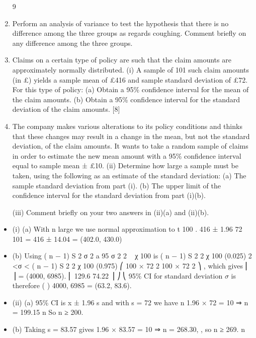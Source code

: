 \documentclass[a4paper,12pt]{article}
\begin{document}
\begin{enumerate}
9
\item Perform an analysis of variance to test the hypothesis that there is no difference among the three groups as regards coughing.
Comment briefly on any difference among the three groups.

\item
Claims on a certain type of policy are such that the claim amounts are approximately normally distributed.
(i)
A sample of 101 such claim amounts (in £) yields a sample mean of £416 and sample standard deviation of £72. For this type of policy:
(a) Obtain a 95\% confidence interval for the mean of the claim amounts.
(b) Obtain a 95\% confidence interval for the standard deviation of the claim amounts.
[8]
\item The company makes various alterations to its policy conditions and thinks that these changes may result in a change in the mean, but not the standard deviation, of the claim amounts. It wants to take a random sample of claims in order to estimate the
new mean amount with a 95\% confidence interval equal to sample mean ± £10.
(ii)
Determine how large a sample must be taken, using the following as an estimate of the standard deviation:
(a) The sample standard deviation from part (i).
(b) The upper limit of the confidence interval for the standard deviation from part (i)(b).

(iii)
Comment briefly on your two answers in (ii)(a) and (ii)(b).
\end{enumerate}
\newpage

\begin{itemize}
\item (i) (a)
With n large we use normal approximation to t 100 .
416 ± 1.96
72
101
= 416 ± 14.04 = (402.0, 430.0)
\item (b)
Using
( n − 1) S 2
σ
2
a 95%
σ 2
2
~ χ 100
is
( n − 1) S 2
2
χ 100
(0.025)
2
<σ <
( n − 1) S 2
2
χ 100
(0.975)
⎛ 100 × 72 2 100 × 72 2 ⎞
,
which gives ⎜
⎟ = (4000, 6985).
⎜ 129.6
74.22 ⎟ ⎠
⎝
95\% CI for standard deviation $\sigma$  is therefore
(
)
4000, 6985 = (63.2, 83.6).
\item (ii)
(a)
95\% CI is x ± 1.96
s
and with s = 72 we have
n
1.96 × 72
= 10 ⇒ n = 199.15
n
So n ≥ 200.
\item (b)
Taking s = 83.57 gives
1.96 × 83.57
= 10 ⇒ n = 268.30, , so n ≥ 269.
n
\end{itemize}
\end{document}
